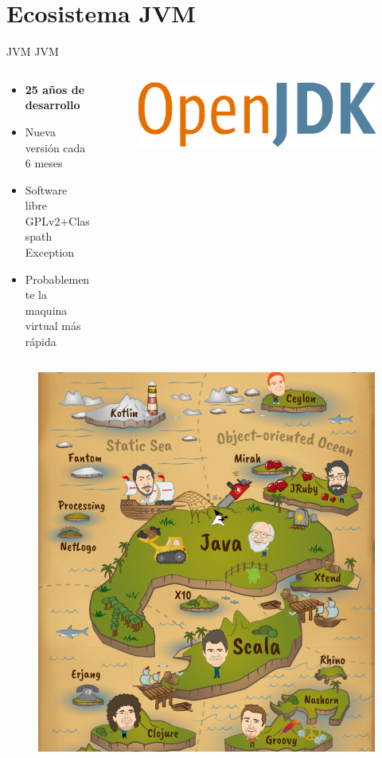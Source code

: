 \documentclass[aspectratio=169]{beamer}
\begin{document}
\section{Ecosistema JVM}
\begin{frame}{JVM}
	JVM

	\begin{columns}[T] %
		\begin{column}[T]{0.5\textwidth} %
			\begin{itemize}
				\item \textbf{25 años de desarrollo}
				\item Nueva versión cada 6 meses
				\item Software libre GPLv2+Classpath Exception
				\item Probablemente la maquina virtual más rápida
			\end{itemize}
		\end{column}
		\begin{column}[T]{7cm} %
			\begin{figure}
				\centering
				\includegraphics[width=\linewidth]{Images/openjdk}
			\end{figure}

		\end{column}
	\end{columns}
\end{frame}
\begin{frame}{}
	\begin{figure}
		\centering
		\includegraphics[width=0.5\linewidth]{Images/pirates}
	\end{figure}

\end{frame}
\end{document}
